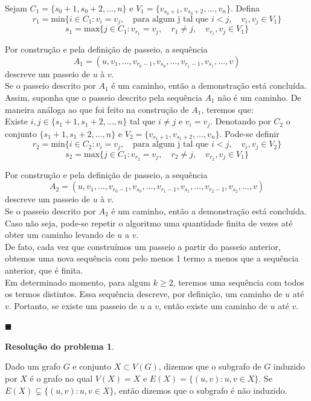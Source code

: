 \documentclass[12pt, a4paper]{article}
\theoremstyle{definition} \newtheorem{prob}{Problema}
\newtheorem{res}{Resolução do problema}
\theoremstyle{plain} \newtheorem*{teo}{Teorema}
\begin{document}
Sejam \(C_1 = \{s_0+1, s_0+2, \ldots, n\}\) e \(V_1 = \{v_{s_0+1}, v_{s_0+2}, \ldots, v_n\}\). Defina \[r_1 = \mathrm{min}\{i \in C_1 : v_i = v_j, \quad \text{para algum j tal que }i < j, \quad v_i, v_j \in V_1\}\] \[s_1 = \mathrm{max}\{j \in C_1: v_{r_1} = v_j, \quad r_1 \neq j, \quad v_{r_1}, v_j \in V_1\}\]

Por construção e pela definição de passeio, a sequência \[A_1=(u, v_1, \ldots, v_{r_0-1}, v_{s_0}, \ldots, v_{r_1 -1}, v_{s_1}, \ldots, v)\]descreve um passeio de \(u\) à \(v\). \\

Se o passeio descrito por \(A_1\) é um caminho, então a demonstração está concluída. Assim, suponha que o passeio descrito pela sequência \(A_1\) não é um caminho. De maneira análoga ao que foi feito na construção de \(A_1\), teremos que: \\

Existe \(i, j \in \{s_1+1, s_1+2, \ldots, n\}\) tal que \(i \neq j\) e \(v_i = v_j\). Denotando por \(C_2\) o conjunto  \(\{s_1+1, s_1+2, \ldots, n\}\) e \(V_2 = \{v_{s_1+1}, v_{s_1+2}, \ldots, v_n\}\). Pode-se definir \[r_2 = \mathrm{min}\{i \in C_2 : v_i = v_j, \quad \text{para algum j tal que }i < j, \quad v_i, v_j \in V_2\}\] \[s_2 = \mathrm{max}\{j \in C_1: v_{r_2} = v_j, \quad r_2 \neq j, \quad v_{r_2}, v_j \in V_1\}\]

Por construção e pela definição de passeio, a sequência \[A_2=(u, v_1, \ldots, v_{r_0-1}, v_{s_0}, \ldots, v_{r_1 -1}, v_{s_1}, \ldots, v_{r_2-1}, v_{s_2}, \ldots, v)\]descreve um passeio de \(u\) à \(v\). \\

Se o passeio descrito por \(A_2\) é um caminho, então a demonstração está concluída. Caso não seja, pode-se repetir o algoritmo uma quantidade finita de vezes até obter um caminho levando de \(u\) a \(v\). \\

De fato, cada vez que construímos um passeio a partir do passeio anterior, obtemos uma nova sequência com pelo menos 1 termo a menos que a sequência anterior, que é finita. \\

Em determinado momento, para algum \(k \geq 2\), teremos uma sequência com todos os termos distintos. Essa sequência descreve, por definição, um caminho de \(u\) até \(v\). Portanto, se existe um passeio de \(u\) a \(v\), então existe um caminho de \(u\) até \(v\).

\begin{flushright}
$\blacksquare$
\end{flushright}

\begin{res} %
\end{res}

Dado um grafo \(G\) e conjunto \(X \subset V(G)\), dizemos que o subgrafo de \(G\) induzido por \(X\) é o grafo no qual \(V(X) = X \) e \(E(X) = \{(u,v): u, v \in X\}\). Se \(E(X) \varsubsetneq \{(u,v): u, v \in X\}\), então dizemos que o subgrafo é não induzido.

 
\end{document}
